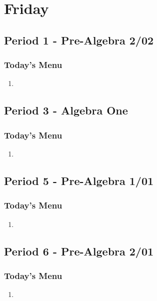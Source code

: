    	 \section[Fri]{Friday}
         \subsection[PA2/02]{Period 1 - Pre-Algebra 2/02}
         \begin{frame}[label=PA2_02]
           	\frametitle{Today's Menu}
           	
          \begin{enumerate}
   	   	   \item
   	   	   \rightarrowitem
   	     \end{enumerate}           	
           	
         \end{frame}
     \subsection[ALG]{Period 3 - Algebra One}
     \begin{frame}[label=ALG1]
     	\frametitle{Today's Menu}
     	
           \begin{enumerate}
   	   	   \item
   	   	   \rightarrowitem
   	     \end{enumerate}     	
     	
      \end{frame}
     \subsection[PA1/01]{Period 5 - Pre-Algebra 1/01}
     \begin{frame}[label=PA1_01]
     	\frametitle{Today's Menu}

          \begin{enumerate}
   	   	   \item
   	   	   \rightarrowitem
   	     \end{enumerate}     	
     	
     \end{frame}
     
      \subsection[PA2/01]{Period 6 - Pre-Algebra 2/01}
      \begin{frame}[label=PA2_01]
      	\frametitle{Today's Menu}

         \begin{enumerate}
   	   	   \item
   	   	   \rightarrowitem
   	     \end{enumerate}
      	
      \end{frame}
   	 
   	
   	     
   	     
 
   